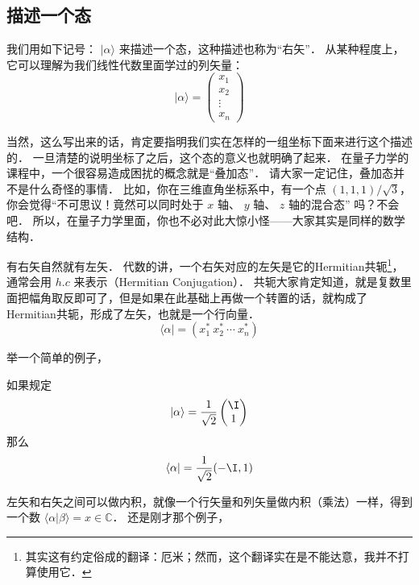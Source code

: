
\subsection{描述一个态}

我们用如下记号： $|\alpha\rangle$ 来描述一个态，这种描述也称为“右矢”． 从某种程度上，它可以理解为我们线性代数里面学过的列矢量：
\begin{equation}
|\alpha\rangle = \left(\begin{matrix}x_1\\x_2\\ \vdots\\ x_n\end{matrix}\right)
\end{equation}

当然，这么写出来的话，肯定要指明我们实在怎样的一组坐标下面来进行这个描述的． 一旦清楚的说明坐标了之后，这个态的意义也就明确了起来． 在量子力学的课程中，一个很容易造成困扰的概念就是“叠加态”． 请大家一定记住，叠加态并不是什么奇怪的事情． 比如，你在三维直角坐标系中，有一个点 $(1, 1, 1)/\sqrt3$，你会觉得“不可思议！竟然可以同时处于 $x$ 轴、 $y$ 轴、 $z$ 轴的混合态” 吗？不会吧． 所以，在量子力学里面，你也不必对此大惊小怪——大家其实是同样的数学结构．

有右矢自然就有左矢． 代数的讲，一个右矢对应的左矢是它的Hermitian共轭\footnote{其实这有约定俗成的翻译：厄米；然而，这个翻译实在是不能达意，我并不打算使用它．}，通常会用 $h. c$ 来表示（Hermitian Conjugation）． 共轭大家肯定知道，就是复数里面把幅角取反即可了，但是如果在此基础上再做一个转置的话，就构成了Hermitian共轭，形成了左矢，也就是一个行向量．
\begin{equation}
\langle\alpha| = (x_1^*\ x_2^*\ \cdots\ x_n^*)
\end{equation}

举一个简单的例子，

\begin{exam}{}
如果规定
\begin{equation}
|\alpha\rangle = \frac{1}{\sqrt{2}}\left(\begin{matrix}\I \\1\end{matrix}\right) 
\end{equation}
那么
\begin{equation}
\langle\alpha| = \frac{1}{\sqrt{2}}(-\I, 1)
\end{equation}
\end{exam}

左矢和右矢之间可以做内积，就像一个行矢量和列矢量做内积（乘法）一样，得到一个数 $\langle\alpha|\beta\rangle = x \in \mathbb{C}$． 还是刚才那个例子，

